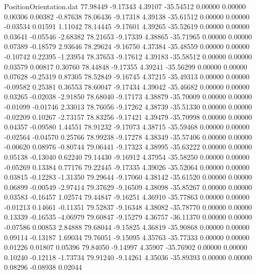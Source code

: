 \begin{filecontents}{PositionOrientation.dat}
  77.98449   -9.17343    4.39107   -35.54512    0.00000    0.00000    0.00306    0.00382   -0.87638
  78.06436   -9.17318    4.39138   -35.61512    0.00000    0.00000   -0.03534    0.01591    1.11042
  78.14445   -9.17601    4.39265   -35.52619    0.00000    0.00000    0.03641   -0.05546   -2.68382
  78.21653   -9.17339    4.38865   -35.71965    0.00000    0.00000    0.07389   -0.18579    2.93646
  78.29624   -9.16750    4.37384   -35.48559    0.00000    0.00000   -0.10742    0.22395   -1.23954
  78.37653   -9.17612    4.39183   -35.58512    0.00000    0.00000    0.03579    0.00817    0.30760
  78.44848   -9.17355    4.39241   -35.56299    0.00000    0.00000    0.07628   -0.25319    0.87305
  78.52849   -9.16745    4.37215   -35.49313    0.00000    0.00000   -0.09582    0.25381    0.36553
  78.60047   -9.17434    4.39042   -35.46682    0.00000    0.00000    0.03265   -0.02038   -2.91850
  78.68040   -9.17173    4.38879   -35.70009    0.00000    0.00000   -0.01099   -0.01746    2.33013
  78.76056   -9.17262    4.38739   -35.51330    0.00000    0.00000   -0.02209    0.10267   -2.73157
  78.83256   -9.17421    4.39479   -35.70998    0.00000    0.00000    0.04357   -0.09580    1.44551
  78.91232   -9.17073    4.38715   -35.59468    0.00000    0.00000   -0.02564   -0.04570    0.25766
  78.99238   -9.17278    4.38349   -35.57406    0.00000    0.00000   -0.00620    0.08976   -0.80744
  79.06441   -9.17323    4.38995   -35.63222    0.00000    0.00000    0.05138   -0.13040    0.62240
  79.14430   -9.16912    4.37954   -35.58250    0.00000    0.00000   -0.05269    0.13384    0.77176
  79.22445   -9.17335    4.39026   -35.52064    0.00000    0.00000    0.03815   -0.12283   -1.31350
  79.29644   -9.17060    4.38142   -35.61520    0.00000    0.00000    0.06899   -0.00549   -2.97414
  79.37629   -9.16509    4.38098   -35.85267    0.00000    0.00000    0.03583   -0.16457    1.02574
  79.44847   -9.16251    4.36910   -35.77863    0.00000    0.00000   -0.01213    0.14661   -0.11351
  79.52837   -9.16348    4.38082   -35.78770    0.00000    0.00000    0.13339   -0.16535   -4.06979
  79.60847   -9.15279    4.36757   -36.11370    0.00000    0.00000   -0.07586    0.00853    2.84888
  79.68044   -9.15825    4.36819   -35.90868    0.00000    0.00000    0.09114   -0.13187    1.69034
  79.76051   -9.15095    4.35763   -35.77333    0.00000    0.00000    0.01226    0.01807    0.05396
  79.84050   -9.14997    4.35907   -35.76902    0.00000    0.00000    0.10240   -0.12118   -1.73734
  79.91240   -9.14261    4.35036   -35.89393    0.00000    0.00000    0.08296   -0.08938    0.02044

\end{filecontents}
